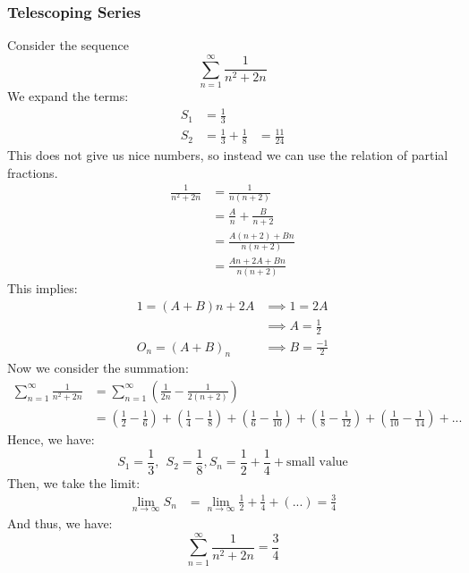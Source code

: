 \documentclass{article}
\begin{document}
\subsubsection{Telescoping Series}
Consider the sequence
$$\sum_{n=1}^\infty \frac{1}{n^2 + 2n}$$
We expand the terms:
\begin{align*}
    S_1 & = \frac{1}{3}\\
    S_2 & = \frac{1}{3} + \frac{1}{8} & = \frac{11}{24}
\end{align*}
This does not give us nice numbers, so instead we can use the relation of partial fractions.
\begin{align*}
    \frac{1}{n^2 + 2n} & = \frac{1}{n(n+2)}\\
    & = \frac{A}{n} + \frac{B}{n+2}\\
    & = \frac{A(n+2) + Bn}{n(n+2)}\\
    & = \frac{An + 2A + Bn}{n(n+2)}
\end{align*}
This implies:
\begin{align*}
    1 = (A+B)n + 2A & \implies 1 = 2A\\
    & \implies A = \frac{1}{2}\\
    O_n = (A+B)_n & \implies B = \frac{-1}{2}
\end{align*}
Now we consider the summation:
\begin{align*}
    \sum_{n=1}^\infty \frac{1}{n^2 + 2n} & = \sum_{n=1}^\infty (\frac{1}{2n} - \frac{1}{2(n+2)})\\
    & = (\frac{1}{2} - \frac{1}{6}) + (\frac{1}{4} - \frac{1}{8}) + (\frac{1}{6} - \frac{1}{10}) + (\frac{1}{8} - \frac{1}{12}) + (\frac{1}{10} - \frac{1}{14}) + ...
\end{align*}
Hence, we have:
$$S_1 = \frac{1}{3}, \ \ S_2 = \frac{1}{8}, S_n = \frac{1}{2} + \frac{1}{4} + \text{small value}$$
Then, we take the limit:
\begin{align*}
    \lim_{n\to\infty} S_n & = \lim_{n\to\infty} \frac{1}{2} + \frac{1}{4} + (...) = \frac{3}{4}
\end{align*}
And thus, we have:
$$\sum_{n=1}^\infty \frac{1}{n^2 + 2n} = \frac{3}{4}$$
\end{document}
